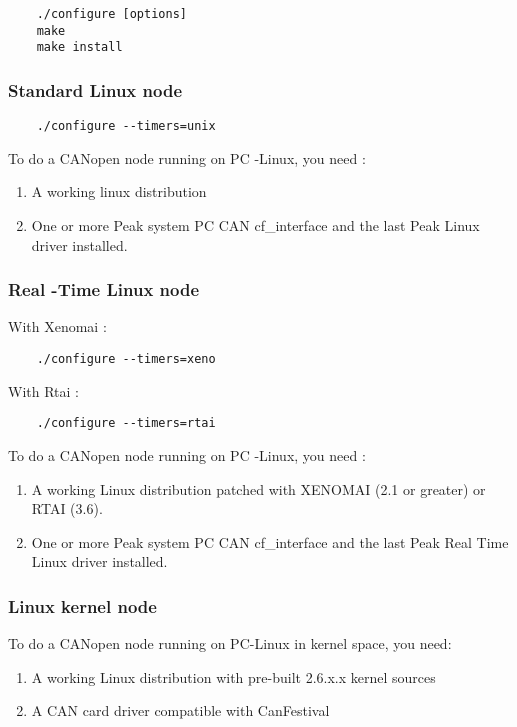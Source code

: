 \documentclass[12pt,english,a4paper]{book}
\newcommand{\canopen}{CANopen }
\begin{document}
\begin{verbatim}
	./configure [options]
	make
	make install
\end{verbatim}




\subsubsection{Standard Linux node}


\begin{verbatim}
	./configure --timers=unix
\end{verbatim}


To do a \canopen node running on PC -Linux, you need :

\begin{enumerate}
\item A working linux distribution 
\item One or more Peak system PC CAN cf_interface and the last Peak Linux driver
installed. 
\end{enumerate}

\subsubsection{Real -Time Linux node}

With Xenomai :
\begin{verbatim}
	./configure --timers=xeno
\end{verbatim}
With Rtai :
\begin{verbatim}
	./configure --timers=rtai
\end{verbatim}

To do a \canopen node running on PC -Linux, you need :

\begin{enumerate}
\item A working Linux distribution patched with XENOMAI (2.1 or greater) or RTAI (3.6). 
\item One or more Peak system PC CAN cf_interface and the last Peak Real Time
Linux driver installed. 
\end{enumerate}

\subsubsection{Linux kernel node}

To do a CANopen node running on PC-Linux in kernel space, you need:


\begin{enumerate}
\item A working Linux distribution with pre-built 2.6.x.x kernel sources
\item A CAN card driver compatible with CanFestival
\end{enumerate}
\end{document}
